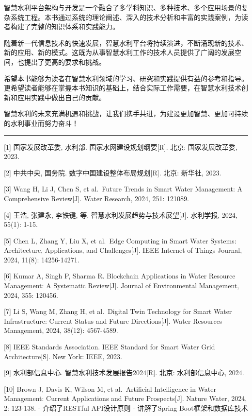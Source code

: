 智慧水利平台架构与开发是一个融合了多学科知识、多种技术、多个应用场景的复杂系统工程。本书通过系统的理论阐述、深入的技术分析和丰富的实践案例，为读者构建了完整的知识体系和实践能力。

随着新一代信息技术的快速发展，智慧水利平台将持续演进，不断涌现新的技术、新的应用、新的模式。这既为从事智慧水利工作的技术人员提供了广阔的发展空间，也提出了更高的要求和挑战。

希望本书能够为读者在智慧水利领域的学习、研究和实践提供有益的参考和指导。更希望读者能够在掌握本书知识的基础上，结合实际工作需要，在智慧水利技术创新和应用实践中做出自己的贡献。

智慧水利的未来充满机遇和挑战，让我们携手共进，为建设更加智慧、更加可持续的水利事业而努力奋斗！

\begin{center}\rule{0.5\linewidth}{0.5pt}\end{center}


{[}1{]} 国家发展改革委, 水利部. 国家水网建设规划纲要{[}R{]}. 北京: 国家发展改革委, 2023.

{[}2{]} 中共中央, 国务院. 数字中国建设整体布局规划{[}R{]}. 北京: 新华社, 2023.

{[}3{]} Wang H, Li J, Chen S, et al.~Future Trends in Smart Water Management: A Comprehensive Review{[}J{]}. Water Research, 2024, 251: 121089.

{[}4{]} 王浩, 张建永, 李铁键, 等. 智慧水利发展趋势与技术展望{[}J{]}. 水利学报, 2024, 55(1): 1-15.

{[}5{]} Chen L, Zhang Y, Liu X, et al.~Edge Computing in Smart Water Systems: Architecture, Applications, and Challenges{[}J{]}. IEEE Internet of Things Journal, 2024, 11(8): 14256-14271.

{[}6{]} Kumar A, Singh P, Sharma R. Blockchain Applications in Water Resource Management: A Systematic Review{[}J{]}. Journal of Environmental Management, 2024, 355: 120456.

{[}7{]} Li S, Wang M, Zhang H, et al.~Digital Twin Technology for Smart Water Infrastructure: Current Status and Future Directions{[}J{]}. Water Resources Management, 2024, 38(12): 4567-4589.

{[}8{]} IEEE Standards Association. IEEE Standard for Smart Water Grid Architecture{[}S{]}. New York: IEEE, 2023.

{[}9{]} 水利部信息中心. 智慧水利技术发展报告2024{[}R{]}. 北京: 水利部信息中心, 2024.

{[}10{]} Brown J, Davis K, Wilson M, et al.~Artificial Intelligence in Water Management: Current Applications and Future Prospects{[}J{]}. Nature Water, 2024, 2: 123-138. - 介绍了RESTful API设计原则 - 讲解了Spring Boot框架和数据库技术

